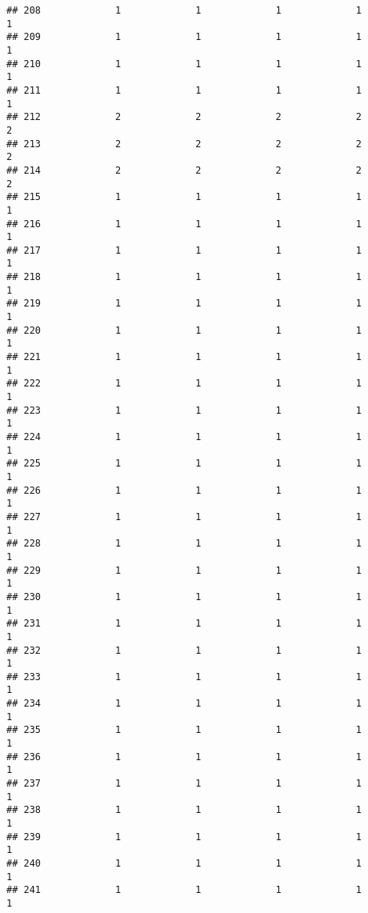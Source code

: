 \documentclass[
]{article}
\begin{document}
\begin{verbatim}
## 208             1             1             1             1             1
## 209             1             1             1             1             1
## 210             1             1             1             1             1
## 211             1             1             1             1             1
## 212             2             2             2             2             2
## 213             2             2             2             2             2
## 214             2             2             2             2             2
## 215             1             1             1             1             1
## 216             1             1             1             1             1
## 217             1             1             1             1             1
## 218             1             1             1             1             1
## 219             1             1             1             1             1
## 220             1             1             1             1             1
## 221             1             1             1             1             1
## 222             1             1             1             1             1
## 223             1             1             1             1             1
## 224             1             1             1             1             1
## 225             1             1             1             1             1
## 226             1             1             1             1             1
## 227             1             1             1             1             1
## 228             1             1             1             1             1
## 229             1             1             1             1             1
## 230             1             1             1             1             1
## 231             1             1             1             1             1
## 232             1             1             1             1             1
## 233             1             1             1             1             1
## 234             1             1             1             1             1
## 235             1             1             1             1             1
## 236             1             1             1             1             1
## 237             1             1             1             1             1
## 238             1             1             1             1             1
## 239             1             1             1             1             1
## 240             1             1             1             1             1
## 241             1             1             1             1             1

\end{verbatim}
\end{document}
